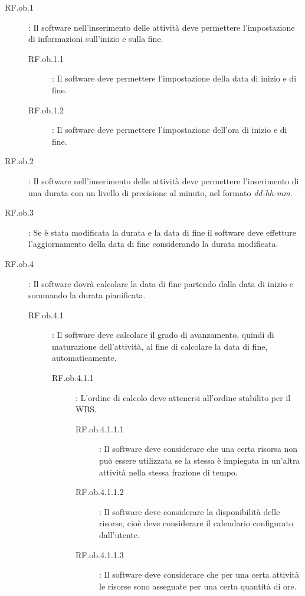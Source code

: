 \begin{description}

\item[RF.ob.1]: Il software nell\textquoteright{}inserimento delle attivit\`{a} deve permettere l\textquoteright{}impostazione di informazioni sull\textquoteright{}inizio e sulla fine.
	\begin{description}
	\item[RF.ob.1.1]: Il software deve permettere l\textquoteright{}impostazione della data di inizio e di fine.
	\item[RF.ob.1.2]: Il software deve permettere l\textquoteright{}impostazione dell\textquoteright{}ora di inizio e di fine.
	\end{description}
\item[RF.ob.2]: Il software nell\textquoteright{}inserimento delle attivit\`{a} deve permettere l\textquoteright{}inserimento di una durata con un livello di precisione al minuto, nel formato \textit{dd-hh-mm}.
\item[RF.ob.3]: Se \`{e} stata modificata la durata e la data di fine il software deve effetture l\textquoteright{}aggiornamento della data di fine considerando la durata modificata.
\item[RF.ob.4]: Il software dovr\`{a} calcolare la data di fine partendo dalla data di inizio e sommando la durata pianificata.
	\begin{description}
	\item[RF.ob.4.1]: Il software deve calcolare il grado di avanzamento, quindi di maturazione dell\textquoteright{}attivit\`{a}, al fine di calcolare la data di fine, automaticamente.
		\begin{description}
		\item[RF.ob.4.1.1]: L\textquoteright{}ordine di calcolo deve attenersi all\textquoteright{}ordine stabilito per il WBS. 
			\begin{description}
			\item[RF.ob.4.1.1.1]: Il software deve considerare che una certa risorsa non pu\`{o} essere utilizzata se la stessa \`{e} impiegata in un\textquoteright{}altra attivit\`{a} nella stessa frazione di tempo.
			\item[RF.ob.4.1.1.2]: Il software deve considerare la disponibilit\`{a} delle risorse, cio\`{e} deve considerare il calendario configurato dall\textquoteright{}utente.
			\item[RF.ob.4.1.1.3]: Il software deve considerare che per una certa attivit\`{a} le risorse sono assegnate per una certa quantit\`{a} di ore. 

\end{description}
\end{description}
\end{description}
\end{description}
